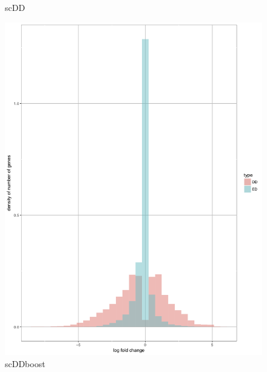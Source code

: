 \documentclass[11pt]{amsart}
\begin{document}
\begin{figure}[H]
  \caption{scDD}\label{fig:scDD}
\endminipage\hfill
{}
  \includegraphics[width=\linewidth]{G45719_scddb.png}
  \caption{scDDboost}\label{fig:scDDboost}
\endminipage\hfill
{}%

\end{figure}
\end{document}
